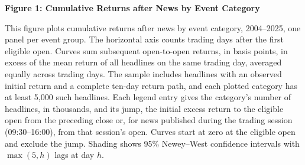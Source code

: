 \documentclass{article}
\begin{document}
\renewcommand{\thetable}{1}

\clearpage
\renewcommand{\thetable}{2}

\clearpage
\renewcommand{\thetable}{3}

\clearpage
\renewcommand{\thetable}{4}

\clearpage
\renewcommand{\thetable}{5}

\clearpage
\renewcommand{\thetable}{6}

\clearpage
\renewcommand{\thetable}{7}

\clearpage
\renewcommand{\thetable}{8}

\clearpage
\renewcommand{\thetable}{9}

\clearpage
\renewcommand{\thetable}{10}

\clearpage
\renewcommand{\thetable}{11}

\clearpage
\renewcommand{\thefigure}{1}\label{fig:fig1_drift}
\begin{center}\textbf{Figure 1: Cumulative Returns after News by Event Category}\end{center}
\begin{minipage}{\linewidth}\footnotesize This figure plots cumulative returns after news by event category, 2004--2025, one panel per event group. The horizontal axis counts trading days after the first eligible open. Curves sum subsequent open-to-open returns, in basis points, in excess of the mean return of all headlines on the same trading day, averaged equally across trading days. The sample includes headlines with an observed initial return and a complete ten-day return path, and each plotted category has at least 5,000 such headlines. Each legend entry gives the category's number of headlines, in thousands, and its jump, the initial excess return to the eligible open from the preceding close or, for news published during the trading session (09:30--16:00), from that session's open. Curves start at zero at the eligible open and exclude the jump. Shading shows 95\% Newey--West confidence intervals with $\max(5,h)$ lags at day $h$.\end{minipage}
\medskip
\end{document}

